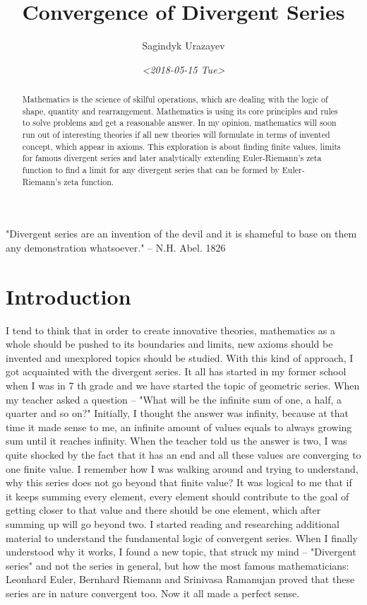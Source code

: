 \documentclass[a4paper]{article}
\author{Sagindyk Urazayev}
\date{\textit{<2018-05-15 Tue>}}
\title{Convergence of Divergent Series}
\begin{document}
\maketitle
\tableofcontents

\listoffigures
\listoftables

\newpage
\begin{center}
"Divergent series are an invention of the devil and it is shameful to base on
them any demonstration whatsoever."\cite{Abel} -- N.H. Abel. 1826
\end{center}

\begin{abstract}
Mathematics is the science of skilful operations, which are dealing with the
logic of shape, quantity and rearrangement. Mathematics is using its core
principles and rules to solve problems and get a reasonable answer. In my
opinion, mathematics will soon run out of interesting theories if all new
theories will formulate in terms of invented concept, which appear in
axioms. This exploration is about finding finite values, limits for famous
divergent series and later analytically extending Euler-Riemann's zeta function
to find a limit for any divergent series that can be formed by Euler- Riemann's
zeta function.
\end{abstract}

\section{Introduction}
\label{sec-1}
\label{sec:intro}

I tend to think that in order to create innovative theories, mathematics as a
whole should be pushed to its boundaries and limits, new axioms should be
invented and unexplored topics should be studied. With this kind of approach, I
got acquainted with the divergent series. It all has started in my former school
when I was in 7 th grade and we have started the topic of geometric series. When
my teacher asked a question – "What will be the infinite sum of one, a half, a
quarter and so on?" Initially, I thought the answer was infinity, because at
that time it made sense to me, an infinite amount of values equals to always
growing sum until it reaches infinity. When the teacher told us the answer is
two, I was quite shocked by the fact that it has an end and all these values are
converging to one finite value. I remember how I was walking around and trying
to understand, why this series does not go beyond that finite value? It was
logical to me that if it keeps summing every element, every element should
contribute to the goal of getting closer to that value and there should be one
element, which after summing up will go beyond two. I started reading and
researching additional material to understand the fundamental logic of
convergent series. When I finally understood why it works, I found a new topic,
that struck my mind – "Divergent series" and not the series in general, but how
the most famous mathematicians: Leonhard Euler, Bernhard Riemann and Srinivasa
Ramanujan proved that these series are in nature convergent too. Now it all made
a perfect sense.\\
\end{document}
